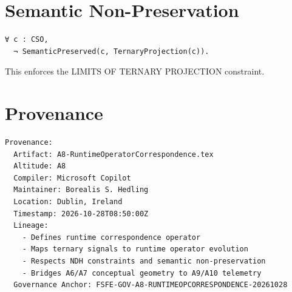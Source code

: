 \documentclass[11pt]{article}
\begin{document}
\section{Semantic Non-Preservation}

\begin{verbatim}
∀ c : CSO,
  ¬ SemanticPreserved(c, TernaryProjection(c)).
\end{verbatim}

This enforces the LIMITS OF TERNARY PROJECTION constraint.

\newpage


\section*{Provenance}

\begin{verbatim}
Provenance:
  Artifact: A8-RuntimeOperatorCorrespondence.tex
  Altitude: A8
  Compiler: Microsoft Copilot
  Maintainer: Borealis S. Hedling
  Location: Dublin, Ireland
  Timestamp: 2026-10-28T08:50:00Z
  Lineage:
    - Defines runtime correspondence operator
    - Maps ternary signals to runtime operator evolution
    - Respects NDH constraints and semantic non-preservation
    - Bridges A6/A7 conceptual geometry to A9/A10 telemetry
  Governance Anchor: FSFE-GOV-A8-RUNTIMEOPCORRESPONDENCE-20261028
\end{verbatim}
\end{document}
